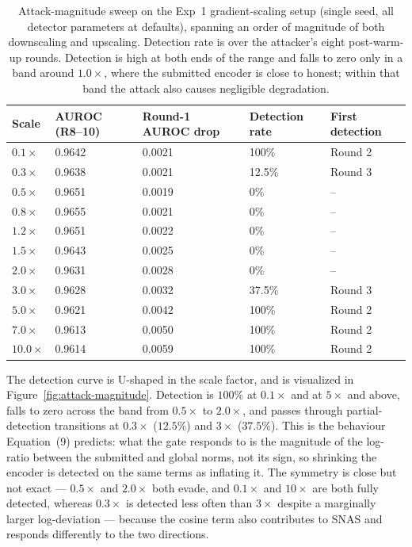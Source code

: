 \documentclass[pdflatex,sn-mathphys-num]{sn-jnl}
\begin{document}
\begin{table}[t]
\caption{Attack-magnitude sweep on the Exp~1 gradient-scaling setup (single seed, all detector parameters at defaults), spanning an order of magnitude of both downscaling and upscaling. Detection rate is over the attacker's eight post-warm-up rounds. Detection is high at both ends of the range and falls to zero only in a band around $1.0\times$, where the submitted encoder is close to honest; within that band the attack also causes negligible degradation.}
\label{tab:attack-magnitude}
\centering
\begin{tabular}{lllll}
\toprule
Scale & AUROC (R8--10) & Round-1 AUROC drop & Detection rate & First detection \\
\midrule
$0.1\times$ & 0.9642 & 0.0021 & 100\% & Round 2 \\
$0.3\times$ & 0.9638 & 0.0021 & 12.5\% & Round 3 \\
$0.5\times$ & 0.9651 & 0.0019 & 0\% & -- \\
$0.8\times$ & 0.9655 & 0.0021 & 0\% & -- \\
$1.2\times$ & 0.9651 & 0.0022 & 0\% & -- \\
$1.5\times$ & 0.9643 & 0.0025 & 0\% & -- \\
$2.0\times$ & 0.9631 & 0.0028 & 0\% & -- \\
$3.0\times$ & 0.9628 & 0.0032 & 37.5\% & Round 3 \\
$5.0\times$ & 0.9621 & 0.0042 & 100\% & Round 2 \\
$7.0\times$ & 0.9613 & 0.0050 & 100\% & Round 2 \\
$10.0\times$ & 0.9614 & 0.0059 & 100\% & Round 2 \\
\bottomrule
\end{tabular}
\end{table}

The detection curve is U-shaped in the scale factor, and is visualized in Figure~\ref{fig:attack-magnitude}. Detection is $100\%$ at $0.1\times$ and at $5\times$ and above, falls to zero across the band from $0.5\times$ to $2.0\times$, and passes through partial-detection transitions at $0.3\times$ ($12.5\%$) and $3\times$ ($37.5\%$). This is the behaviour Equation~(9) predicts: what the gate responds to is the magnitude of the log-ratio between the submitted and global norms, not its sign, so shrinking the encoder is detected on the same terms as inflating it. The symmetry is close but not exact --- $0.5\times$ and $2.0\times$ both evade, and $0.1\times$ and $10\times$ are both fully detected, whereas $0.3\times$ is detected less often than $3\times$ despite a marginally larger log-deviation --- because the cosine term also contributes to SNAS and responds differently to the two directions.
\end{document}
